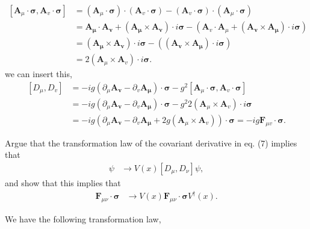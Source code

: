 \documentclass[working, oneside]{../../../Preambles/tuftebook}
\begin{document}
\begin{align*}
    \left[ \mathbf{A}_{\mu }\cdot \mathbf{\sigma}, \mathbf{A}_v \cdot \mathbf{\sigma} \right] &= 
    \left( \mathbf{A}_{\mu }\cdot \mathbf{\sigma}\right)\cdot \left(    \mathbf{A}_v \cdot \mathbf{\sigma} \right) -
     \left(    \mathbf{A}_v \cdot \mathbf{\sigma} \right)\cdot\left( \mathbf{A}_{\mu }\cdot \mathbf{\sigma}\right) \\
     &= \mathbf{A_\mu }\cdot \mathbf{A_v} + \left( \mathbf{A_\mu }\times \mathbf{A_v} \right) \cdot i\mathbf{\sigma}  -
\left(    \mathbf{A }_v\cdot \mathbf{A}_{\mu } + \left( \mathbf{A_v }\times \mathbf{A_\mu } \right) \cdot i\mathbf{\sigma}  \right)\\
     &=  \left( \mathbf{A_\mu }\times \mathbf{A_v} \right) \cdot i\mathbf{\sigma}  -
\left(   \left( \mathbf{A_v }\times \mathbf{A_\mu } \right) \cdot i\mathbf{\sigma}  \right)\\
     &=2\left( \mathbf{A}_{\mu }\times \mathbf{A}_{v} \right) \cdot i\mathbf{\sigma}
.\end{align*}
we can insert this,
\begin{align*}
     \left[ D_\mu , D_v \right] &=  
     -ig\left(\partial_\mu \mathbf{A_v}-  \partial_v\mathbf{A_\mu } \right) \cdot \mathbf{\sigma} -g^2 \left[ \mathbf{A}_{\mu }\cdot \mathbf{\sigma}, \mathbf{A}_v\cdot \mathbf{\sigma} \right] \\
    &=  -ig\left(\partial_\mu \mathbf{A_v}-  \partial_v\mathbf{A_\mu } \right) \cdot \mathbf{\sigma} -g^2 2\left( \mathbf{A}_{\mu }\times \mathbf{A}_{v} \right) \cdot i\mathbf{\sigma} \\
    &=  -ig\left(\partial_\mu \mathbf{A_v}-  \partial_v\mathbf{A_\mu }  +2g\left( \mathbf{A}_{\mu }\times \mathbf{A}_{v} \right) \right)\cdot \mathbf{\sigma} = -ig\mathbf{F}_{\mu v}\cdot \mathbf{\sigma}
.\end{align*}
\begin{exercise}[2]
Argue that the transformation law of the covariant derivative in eq. (7) implies that
\begin{align*}
[D_\mu, D_\nu]\psi &\rightarrow V(x)[D_\mu, D_\nu]\psi, \tag{12}
\end{align*}
and show that this implies that
\begin{align*}
\mathbf{F}_{\mu\nu} \cdot \boldsymbol{\sigma} &\rightarrow V(x) \mathbf{F}_{\mu\nu} \cdot \boldsymbol{\sigma} V^\dagger(x). \tag{13}
\end{align*}
\end{exercise}
We have the following transformation law,
\end{document}
